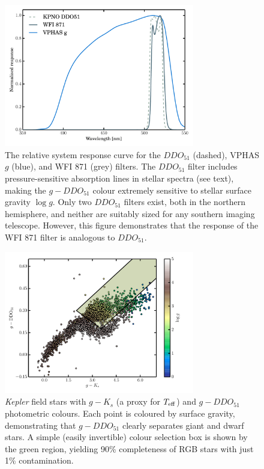 \documentclass[a4paper]{article}
\begin{document}
\begin{SupportingMaterial}

\begin{figure}
\includegraphics[width=8.3cm,angle=0,clip=true]{filter-response}
\caption{\label{image1} The relative system response curve for the $DDO_{51}$ (dashed), VPHAS $g$ (blue), and WFI 871 (grey) filters. The $DDO_{51}$ filter includes pressure-sensitive absorption lines in stellar spectra (see text), making the $g-DDO_{51}$ colour extremely sensitive to stellar surface gravity $\log{g}$. Only two $DDO_{51}$ filters exist, both in the northern hemisphere, and neither are suitably sized for any southern imaging telescope. However, this figure demonstrates that the response of the WFI 871 filter is analogous to $DDO_{51}$.}
\end{figure}


\begin{figure}
\includegraphics[width=8.3cm,angle=0,clip=true]{giant-selection}
\caption{\label{image2} \textit{Kepler} field stars with $g-K_s$ (a proxy for $T_{\rm eff}$) and $g-DDO_{51}$ photometric colours. Each point is coloured by surface gravity, demonstrating that $g-DDO_{51}$ clearly separates giant and dwarf stars. A simple (easily invertible) colour selection box is shown by the green region, yielding 90\% completeness of RGB stars with just 1\% contamination.}
\end{figure}




\end{SupportingMaterial}
\end{document}
